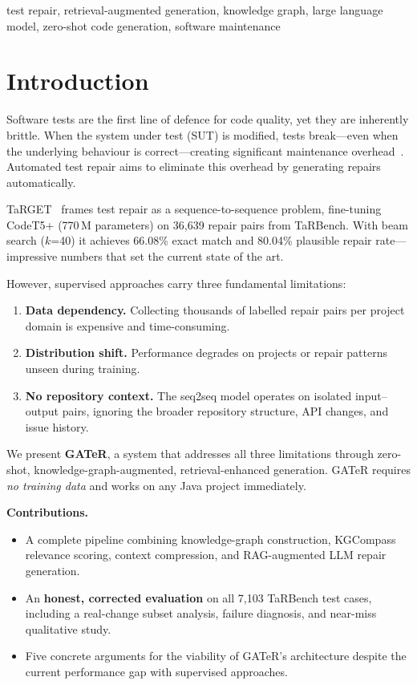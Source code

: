 \documentclass[conference,10pt]{IEEEtran}
\begin{document}
\begin{IEEEkeywords}
test repair, retrieval-augmented generation, knowledge graph,
large language model, zero-shot code generation, software maintenance
\end{IEEEkeywords}

\section{Introduction}
\label{sec:intro}

Software tests are the first line of defence for code quality, yet they
are inherently brittle.  When the system under test (SUT) is modified,
tests break---even when the underlying behaviour is correct---creating
significant maintenance overhead~\cite{tarbench2023}.  Automated test
repair aims to eliminate this overhead by generating repairs
automatically.

TaRGET~\cite{target2024} frames test repair as a sequence-to-sequence
problem, fine-tuning CodeT5+ (770\,M parameters) on 36{,}639 repair
pairs from TaRBench.  With beam search ($k$=40) it achieves 66.08\%
exact match and 80.04\% plausible repair rate---impressive numbers that
set the current state of the art.

However, supervised approaches carry three fundamental limitations:
\begin{enumerate}
    \item \textbf{Data dependency.} Collecting thousands of labelled
          repair pairs per project domain is expensive and
          time-consuming.
    \item \textbf{Distribution shift.} Performance degrades on
          projects or repair patterns unseen during training.
    \item \textbf{No repository context.} The seq2seq model operates
          on isolated input--output pairs, ignoring the broader
          repository structure, API changes, and issue history.
\end{enumerate}

We present \textbf{GATeR}, a system that addresses all three
limitations through zero-shot, knowledge-graph-augmented,
retrieval-enhanced generation.  GATeR requires \emph{no training data}
and works on any Java project immediately.

\textbf{Contributions.}
\begin{itemize}
  \item A complete pipeline combining knowledge-graph construction,
        KGCompass relevance scoring, context compression, and
        RAG-augmented LLM repair generation.
  \item An \textbf{honest, corrected evaluation} on all 7{,}103 TaRBench
        test cases, including a real-change subset analysis, failure
        diagnosis, and near-miss qualitative study.
  \item Five concrete arguments for the viability of GATeR's
        architecture despite the current performance gap with supervised
        approaches.
\end{itemize}
\end{document}
